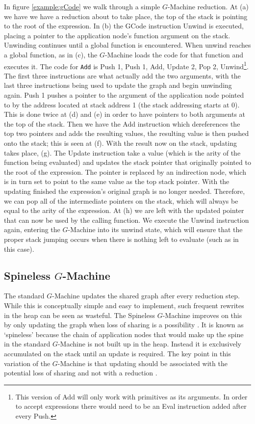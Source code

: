 In figure \ref{example:gCode} we walk through a simple $G$-Machine reduction. 
At (a) we have we have a reduction about to take place, the top of the stack is
pointing to the root of the expression. In (b) the GCode instruction Unwind is
executed, placing a pointer to the application node's function argument on the
stack. Unwinding continues until a global function is encountered. 
When unwind reaches a global function, as in (c), the $G$-Machine loads
the code for that function and executes it. The code for \verb-Add- is Push 1,
Push 1, Add, Update 2, Pop 2, Unwind\footnote{This version of Add will only work
with primitives as its arguments. In order to accept expressions there would
need to be an Eval instruction added after every Push.}. 
The first three instructions are what
actually add the two arguments, with the last three instructions being used to
update the graph and begin unwinding again. Push 1 pushes a pointer to the
argument of the application node pointed to by the address located at stack
address 1 (the stack addressing starts at 0). This is done twice at (d)
and (e) in order to have pointers to both arguments at the top of the stack.
Then we have the Add instruction which dereferences the top two pointers and
adds the resulting values, the resulting value is then pushed onto the stack;
this is seen at (f). With the result now on the stack, updating takes place, (g). 
The Update instruction take a value (which is the arity of the function being
evaluated) and updates the stack pointer that originally pointed to the root of
the expression. The pointer is replaced by an indirection node, which is in turn
set to point to the same value as the top stack pointer. With the updating
finished the expression's original graph is no longer needed. Therefore, we can
pop all of the intermediate pointers on the stack, which will always be equal to
the arity of the expression. At (h) we are left with the updated pointer that
can now be used by the calling function. We execute the Unwind instruction again,
entering the $G$-Machine into its unwind state, which will ensure that the
proper stack jumping occurs when there is nothing left to evaluate (such as in
this case).

 \subsection{Spineless $G$-Machine}
    The standard $G$-Machine updates the shared graph after every reduction
step. While this is conceptually simple and easy to implement, such frequent
rewrites in the heap can be seen as wasteful. The Spineless
$G$-Machine improves on this by only updating the graph when loss of sharing is
a possibility \cite{burn1988spineless}. It is known as `spineless' because the 
chain of application nodes that would make up the spine in the standard 
$G$-Machine is not built up in the heap. Instead it is exclusively 
accumulated on the stack until an update is required. The key point in this
variation of the $G$-Machine is that updating should be associated with the
potential loss of sharing and not with a reduction \cite{burn1988spineless}.

